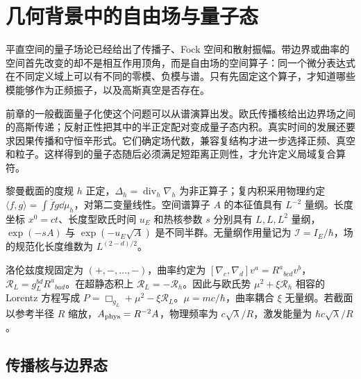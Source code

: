 \chapter{几何背景中的自由场与量子态}\label{chap:ghs-geometric-free-states}
\label{chap:ghs-quantum-boundary-states}
\label{chap:ghs-free-field-arbitrary-slice}
\label{chap:ghs-state-operator-general-setting}
\label{chap:ghs-causal-field-algebra}
\label{chap:ghs-r6-hyperbolic-symplectic}
\label{chap:ghs-lorentzian-general}

平直空间的量子场论已经给出了传播子、Fock 空间和散射振幅。带边界或曲率的空间首先改变的却不是相互作用顶角，而是自由场的空间算子：同一个微分表达式在不同定义域上可以有不同的零模、负模与谱。只有先固定这个算子，才知道哪些模能够作为正频振子，以及高斯真空是否存在。

前章的一般截面量子化使这个问题可以从谱演算出发。欧氏传播核给出边界场之间的高斯传递；反射正性把其中的半正定配对变成量子态内积。真实时间的发展还要求因果传播和守恒辛形式。它们确定场代数，兼容复结构才进一步选择正频、真空和粒子。这样得到的量子态随后必须满足短距离正则性，才允许定义局域复合算符。

\begin{definition}
黎曼截面的度规 $h$ 正定，$\Delta_h=\operatorname{div}_h\nabla_h$ 为非正算子；复内积采用物理约定 $\langle f,g\rangle=\int\overline f g\dd\mu_h$，对第二变量线性。空间谱算子 $A$ 的本征值具有 $L^{-2}$ 量纲。长度坐标 $x^0=ct$、长度型欧氏时间 $u_E$ 和热核参数 $s$ 分别具有 $L,L,L^2$ 量纲，$\exp(-sA)$ 与 $\exp(-u_E\sqrt A)$ 是不同半群。无量纲作用量记为 $\mathscr I=I_E/\hbar$，场的规范化长度维数为 $L^{(2-d)/2}$。

洛伦兹度规固定为 $(+,-,\ldots,-)$，曲率约定为 $[\nabla_c,\nabla_d]v^a=R^a{}_{bcd}v^b$，$\mathcal R_L=g_L^{bd}R^a{}_{bad}$。在超静态积上 $\mathcal R_L=-\mathcal R_h$。因此与欧氏势 $\mu^2+\xi\mathcal R_h$ 相容的 Lorentz 方程写成 $P=\Box_{g_L}+\mu^2-\xi\mathcal R_L$。$\mu=mc/\hbar$，曲率耦合 $\xi$ 无量纲。若截面以参考半径 $R$ 缩放，$A_{\rm phys}=R^{-2}A$，物理频率为 $c\sqrt\lambda/R$，激发能量为 $\hbar c\sqrt\lambda/R$。
\end{definition}

\section{传播核与边界态}
\label{sec:ghs-euclidean-boundary-kernels}


